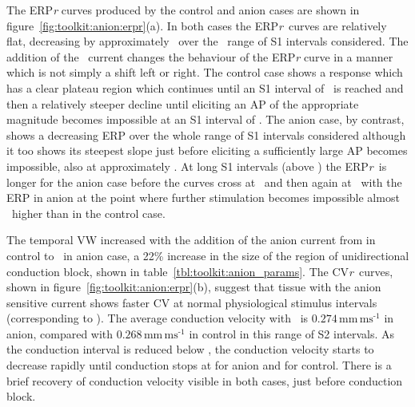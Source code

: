 The ERP\emph{r} curves produced by the control and anion cases are shown in
figure~\ref{fig:toolkit:anion:erpr}(a).
In both cases the ERP\emph{r}\ curves are relatively
flat, decreasing by approximately \ over the \ range of S1
intervals considered.  The addition of the \ current changes the
behaviour of the ERP\emph{r} curve in a manner which is not simply a shift left
or right.  The control case shows a response which has a clear plateau region
which continues until an S1 interval of \ is reached and then a
relatively steeper decline until eliciting an AP of the appropriate magnitude
becomes impossible at an S1 interval of .  The anion case, by contrast,
shows a decreasing ERP over the whole range of S1 intervals considered although
it too shows its steepest slope just before eliciting a sufficiently large AP
becomes impossible, also at approximately .  At long S1 intervals (above
) the ERP\emph{r}\ is longer for the anion case before the curves cross
at \  and then again at \ with the ERP in anion at the point
where further stimulation becomes impossible almost \ higher than in the
control case.

The temporal VW increased with the addition of the anion current from 
in control to \ in anion case, a 22\% increase in the size of the
region of unidirectional conduction block, shown in table~\ref{tbl:toolkit:anion_params}.
The CV\emph{r}\ curves, shown in
figure~\ref{fig:toolkit:anion:erpr}(b), suggest that tissue with the anion sensitive current
shows faster CV at normal physiological stimulus intervals (corresponding to
).
The average conduction velocity with \ is
$0.274\,\text{mm}\,\text{ms}^{\text{-1}}$ in anion,
compared with $0.268\,\text{mm}\,\text{ms}^{\text{-1}}$ in control in this range
of S2 intervals.
As the conduction interval is reduced below , the conduction velocity
starts to decrease rapidly until conduction stops at  for anion and
 for control.
There is a brief recovery of conduction velocity visible in both cases, just
before conduction block.

